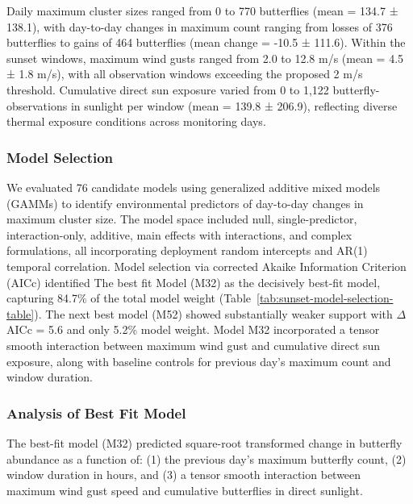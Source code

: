 Daily maximum cluster sizes ranged from 0 to 770 butterflies (mean = 134.7 ± 138.1), with day-to-day changes in maximum count ranging from losses of 376 butterflies to gains of 464 butterflies (mean change = -10.5 ± 111.6). Within the sunset windows, maximum wind gusts ranged from 2.0 to 12.8 m/s (mean = 4.5 ± 1.8 m/s), with all observation windows exceeding the proposed 2 m/s threshold. Cumulative direct sun exposure varied from 0 to 1,122 butterfly-observations in sunlight per window (mean = 139.8 ± 206.9), reflecting diverse thermal exposure conditions across monitoring days.

\subsubsection{Model Selection}

We evaluated 76 candidate models using generalized additive mixed models (GAMMs) to identify environmental predictors of day-to-day changes in maximum cluster size. The model space included null, single-predictor, interaction-only, additive, main effects with interactions, and complex formulations, all incorporating deployment random intercepts and AR(1) temporal correlation. Model selection via corrected Akaike Information Criterion (AICc) identified The best fit Model (M32) as the decisively best-fit model, capturing 84.7\% of the total model weight (Table~\ref{tab:sunset-model-selection-table}). The next best model (M52) showed substantially weaker support with $\Delta$AICc = 5.6 and only 5.2\% model weight. Model M32 incorporated a tensor smooth interaction between maximum wind gust and cumulative direct sun exposure, along with baseline controls for previous day's maximum count and window duration.



\subsubsection{Analysis of Best Fit Model}

The best-fit model (M32) predicted square-root transformed change in butterfly abundance as a function of: (1) the previous day's maximum butterfly count, (2) window duration in hours, and (3) a tensor smooth interaction between maximum wind gust speed and cumulative butterflies in direct sunlight.

